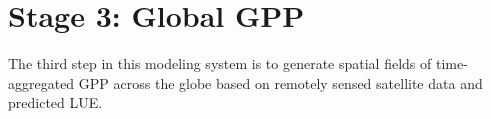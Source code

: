%
%
%
%
%
\section{Stage 3: Global GPP}
\label{sec:mst3}
The third step in this modeling system is to generate spatial fields of time-aggregated GPP across the globe based on remotely sensed satellite data and predicted LUE. 
